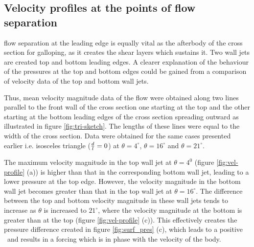 



\subsection{Velocity profiles at the points of flow separation}

 flow separation at the leading edge is equally vital as the afterbody of the cross section for galloping, as it creates the shear layers which sustains it. Two wall jets are created top and bottom leading edges. A clearer explanation of the behaviour of the pressures at the top and bottom edges could be gained from a comparison of velocity data of the top and bottom wall jets.
 
 Thus, mean velocity magnitude data of the flow were obtained along two lines parallel to the front wall of the cross section one starting at the top and the other starting at the bottom leading edges of the cross section spreading outward as illustrated in figure \ref{fig:tri-sketch}. The lengths of these lines were equal to the width of the cross section. Data were obtained for the same cases presented earlier i.e. isosceles triangle ($\frac{d}{l}=0$) at $\theta=4^{\circ}$, $\theta=16^{\circ}$ and $\theta=21^{\circ}$.  






The maximum velocity magnitude in the top wall jet at $\theta= 4^{0}$ (figure \ref{fig:vel-profile} (a)) is higher than that in the corresponding bottom wall jet, leading to a lower pressure at the top edge. However, the velocity magnitude in the bottom wall jet becomes greater than that in the top wall jet at $\theta=16^{\circ}$. The difference between the top and bottom velocity magnitude in these wall jets tends to increase as $\theta$ is increased to $21^{\circ}$, where the velocity magnitude at the bottom is greater than at the top (figure \ref{fig:vel-profile} (c)). This effectively creates the pressure difference created in figure \ref{fig:surf_pres} (c), which leads to a positive \cy\ and results in a forcing which is in phase with the velocity of the body. 

